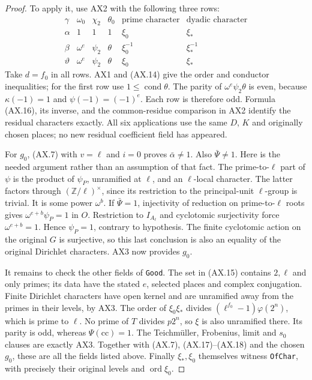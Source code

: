 \begin{proof}
To apply it, use AX2 with the following three rows:
\[
\begin{array}{c|ccccc}
\gamma&\omega_0&\chi_2&\theta_0&\text{prime character}&
                 \text{dyadic character}\\ \hline
\alpha&1&1&1&\xi_0&\xi_*\\
\beta&\omega^e&\psi_2&\theta&\xi_0^{-1}&\xi_*^{-1}\\
\vartheta&\omega^e&\psi_2&\theta&\xi_0&\xi_*
\end{array}\tag{AX.18}
\]
Take $d=f_0$ in all rows.  AX1 and (AX.14) give the order and
conductor inequalities; for the first row use
$1\le\operatorname{cond}\theta$.  The parity of
$\omega^e\psi_2\theta$ is even, because
$\kappa(-1)=1$ and $\psi(-1)=(-1)^e$.
Each row is therefore odd.  Formula (AX.16), its inverse, and
the common-residue comparison in AX2 identify the residual
characters exactly.  All six applications use the same $D$, $K$
and originally chosen places; no new residual coefficient field
has appeared.

For $g_0$, (AX.7) with $v=\ell$ and $i=0$ proves
$\bar\alpha\ne1$.  Also $\bar\Psi\ne1$.  Here is the needed
argument rather than an assumption of that fact.  The prime-to-$\ell$
part of $\psi$ is the product of $\psi_P$, unramified at $\ell$,
and an $\ell$-local character.  The latter factors through
$(\mathbb Z/\ell)^\times$, since its restriction to the
principal-unit $\ell$-group is trivial.  It is some power
$\omega^b$.  If $\bar\Psi=1$, injectivity of reduction on
prime-to-$\ell$ roots gives $\omega^{e+b}\psi_P=1$ in $O$.
Restriction to $I_{A_\ell}$ and cyclotomic surjectivity force
$\omega^{e+b}=1$.  Hence $\psi_P=1$, contrary to hypothesis.
The finite cyclotomic action on the original $G$ is surjective,
so this last conclusion is also an equality of the original
Dirichlet characters.  AX3 now provides $g_0$.

It remains to check the other fields of \texttt{Good}.
The set in (AX.15) contains $2,\ell$ and only primes; its data
have the stated $e$, selected places and complex conjugation.
Finite Dirichlet characters have open kernel and are unramified
away from the primes in their levels, by AX3.
The order of $\xi_0\xi_*$ divides
$(\ell^{f_0}-1)\varphi(2^n)$, which is prime to $\ell$.
No prime of $T$ divides $p2^n$, so $\xi$ is also unramified
there.  Its parity is odd, whereas $\Psi(\mathrm{cc})=1$.
The Teichm\"uller, Frobenius, limit and $s_0$ clauses are exactly
AX3.  Together with (AX.7), (AX.17)--(AX.18) and the chosen $g_0$,
these are all the fields listed above.  Finally $\xi_*,\xi_0$
themselves witness \texttt{OfChar}, with precisely their original
levels and $\operatorname{ord}\xi_0$.
\end{proof}

